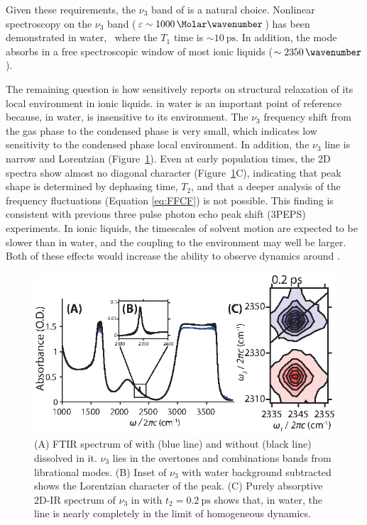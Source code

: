 \documentclass[%
  class = book,%
  crop = false,%
  float = true,%
  multi = true,%
  preview = false,%
]{standalone}
\let\cite\autocite
\begin{document}
Given these requirements, the \(\nu_3\) band of  is a natural choice. Nonlinear spectroscopy on the \(\nu_3\) band (\(\varepsilon \sim \SI{1000}{\per\Molar\wavenumber}\)) has been demonstrated in water,~\cite{Hamm1998,Garrett-Roe2009a} where the \(T_1\) time is \(\sim \SI{10}{\ps}\). In addition, the mode absorbs in a free spectroscopic window of most ionic liquids (\(\sim \SI{2350}{\wavenumber}\)).

The remaining question is how sensitively  reports on structural relaxation of its local environment in ionic liquids.  in water is an important point of reference because, in water,  is insensitive to its environment. The  \(\nu_3\) frequency shift from the gas phase to the condensed phase is very small, which indicates low sensitivity to the condensed phase local environment.  In addition, the  \(\nu_3\) line is narrow and Lorentzian (Figure~\ref{fig:CO2 in water}). Even at early population times, the 2D spectra show almost no diagonal character (Figure~\ref{fig:CO2 in water}C), indicating that peak shape is determined by dephasing time, \(T_2\), and that a deeper analysis of the frequency fluctuations (Equation \ref{eq:FFCF}) is not possible. This finding is consistent with previous three pulse photon echo peak shift (3PEPS) experiments.\cite{Hamm1998} In ionic liquids, the timescales of solvent motion are expected to be slower than in water, and the coupling to the environment may well be larger. Both of these effects would increase the ability to observe dynamics around .

\begin{figure}
  \centering
  \includegraphics[scale=1.25]{fig1.eps}
  \caption[Linear and 2D-IR of \texorpdfstring{ in }{carbon dioxide in water}]{\label{fig:CO2 in water}(A) FTIR spectrum of  with (blue line) and without (black line)  dissolved in it.  \(\nu_3\) lies in the overtones and combinations bands from  librational modes. (B) Inset of \(\nu_3\) with water background subtracted shows the Lorentzian character of the peak. (C) Purely absorptive 2D-IR spectrum of \(\nu_3\) in  with \(t_2 = \SI{0.2}{\ps}\) shows that, in water, the line is nearly completely in the limit of homogeneous dynamics.}
\end{figure}
\end{document}
